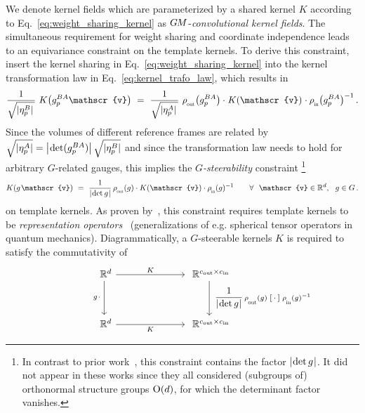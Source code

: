 We denote kernel fields which are parameterized by a shared kernel $K$ according to Eq.~\eqref{eq:weight_sharing_kernel} as $G\mkern-1.4muM$-\emph{convolutional kernel fields}.
The simultaneous requirement for weight sharing and coordinate independence leads to an equivariance constraint on the template kernels.
To derive this constraint, insert the kernel sharing in Eq.~\eqref{eq:weight_sharing_kernel} into the kernel transformation law in Eq.~\eqref{eq:kernel_trafo_law}, which results in
\begin{align}
    \frac{1}{\sqrt{|\eta_p^B|\,}}\ K\big(g_p^{BA} \mathscr{v}\big)
    \ =\ 
    \frac{1}{\sqrt{|\eta_p^A|\,}}\ 
    \rhoout\big(g_p^{BA}\big) \cdot\mkern1mu 
    K(\mathscr{v})
    \mkern1mu\cdot \rhoin\big(g_p^{BA}\big)^{-1} \,.
\end{align}
Since the volumes of different reference frames are related by
$\sqrt{|\eta_p^A|} = \big|\mkern-2mu \det(g_p^{BA})\big|\, \sqrt{|\eta_p^B|}$
and since the transformation law needs to hold for arbitrary $G$-related gauges, this implies the \emph{$G$-steerability} constraint%
\footnote{
    In contrast to prior work~\cite{3d_steerableCNNs,Weiler2019_E2CNN,gaugeIco2019,kicanaoglu2019gaugeSphere,deHaan2020meshCNNs}, this constraint contains the factor $|\mkern-2mu \det g \mkern1mu|$.
    It did not appear in these works since they all considered (subgroups of) orthonormal structure groups $\operatorname{O}(d)$, for which the determinant factor vanishes.
}
\begin{align}\label{eq:kernel_constraint}
    K(g\mkern1.5mu \mathscr{v})\ = \ \frac{1}{\detg}\, \rhoout(g) \cdot K(\mathscr{v}) \cdot \rhoin(g)^{-1}
    \qquad \forall\ \ \mathscr{v} \in \R^d,\ \ g\in G \,.
\end{align}
on template kernels.
As proven by~\citet{lang2020WignerEckart}, this constraint requires template kernels to be \emph{representation operators}~\cite{jeevanjee2011reprOp} (generalizations of e.g. spherical tensor operators in quantum mechanics).
Diagrammatically, a $G$-steerable kernels $K$ is required to satisfy the commutativity of
\begin{equation}\label{cd:kernel_steerability}
\qquad\qquad
\begin{tikzcd}[column sep=70pt, row sep=35pt, font=\normalsize]
    \R^d
        \arrow[d, "g\mkern2mu \cdot\,"']
        \arrow[r, "K"]
    &
    \R^{\cout\times\cin}
        \arrow[d, "\ \scalebox{.96}{$\displaystyle \frac{1}{\detg}$}\, \rhoout(g) \; \scalebox{1.1}{$[\,\cdot\,]$} \; \rhoin(g)^{-1}"]
    \\
    \R^d
        \arrow[r, "K"']
    &
    \R^{\cout\times\cin}
\end{tikzcd}
\end{equation}
